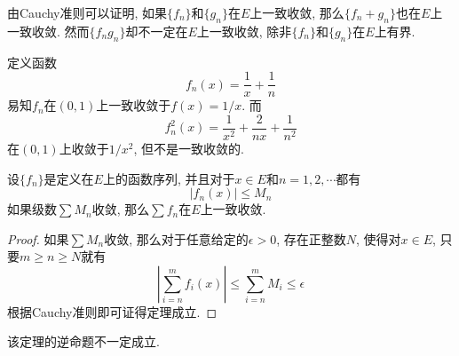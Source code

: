 \documentclass[cn,12pt,math=mtpro2,citestyle=gb7714-2015,bibstyle=gb7714-2015,twocol]{elegantbook}
\begin{document}
\begin{remark}
由Cauchy准则可以证明, 如果$\{f_n\}$和$\{g_n\}$在$E$上一致收敛, 那么$\{f_n+g_n\}$也在$E$上一致收敛. 然而$\{f_ng_n\}$却不一定在$E$上一致收敛, 除非$\{f_n\}$和$\{g_n\}$在$E$上有界.
\end{remark}
\begin{example}
定义函数
$$f_n(x)=\frac{1}{x}+\frac{1}{n}$$
易知$f_n$在$(0,1)$上一致收敛于$f(x)=1/x$. 而
$$f^2_n(x)=\frac{1}{x^2}+\frac{2}{nx}+\frac{1}{n^2}$$
在$(0,1)$上收敛于$1/x^2$, 但不是一致收敛的.
\end{example}
\begin{theorem}[Weierstrass判别法]
  设$\{f_n\}$是定义在$E$上的函数序列, 并且对于$x\in E$和$n=1,2,\cdots$都有
  $$|f_n(x)|\leq M_n$$
  如果级数$\sum M_n$收敛, 那么$\sum f_n$在$E$上一致收敛.
\end{theorem}
\begin{proof}
  如果$\sum M_n$收敛, 那么对于任意给定的$\epsilon>0$, 存在正整数$N$, 使得对$x\in E$, 只要$m\geq n\geq N$就有
  $$\left|\sum_{i=n}^{m}f_i(x)\right|\leq \sum_{i=n}^{m}M_i\leq\epsilon$$
  根据Cauchy准则即可证得定理成立.

\end{proof}
\begin{remark}
该定理的逆命题不一定成立.
\end{remark}
\end{document}
